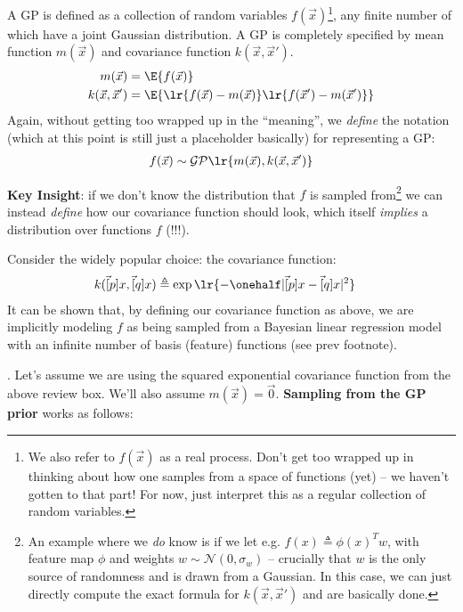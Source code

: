 \documentclass[11pt]{article}
\begin{document}
\begin{example}
	A GP is defined as a collection of random variables $f(\vec x)$\footnote{We also refer to $f(\vec x)$ as a real process. Don't get too wrapped up in thinking about how one samples from a space of functions (yet) -- we haven't gotten to that part! For now, just interpret this as a regular collection of random variables.}, any finite number of which have a joint Gaussian distribution. A GP is completely specified by mean function $m(\vec x)$ and covariance function $k(\vec x, \vec{x}')$. 
	\begin{align}
		m(\vec x) 
			&= \E{f(\vec x)} \\
		k(\vec x, \vec x')
			&= \E{ \lr{  f(\vec x) - m(\vec x) }   \lr{ f(\vec x')  - m(\vec x') }  }
	\end{align}
	Again, without getting too wrapped up in the ``meaning'', we \textit{define} the notation (which at this point is still just a placeholder basically) for representing a GP:
	\begin{align}
		f(\vec x) \sim \mathcal{GP}\lr{  m(\vec x), k(\vec x, \vec x') }
	\end{align}

	\textbf{Key Insight}: if we don't know the distribution that $f$ is sampled from\footnote{An example where we \textit{do} know is if we let e.g. $f(x) \triangleq \phi(x)^T w$, with feature map $\phi$ and weights $w \sim \mathcal{N}(0, \sigma_w)$ -- crucially that $w$ is the only source of randomness and is drawn from a Gaussian. In this case, we can just directly compute the exact formula for $k(\vec x, \vec x')$ and are basically done.} we can instead \textit{define} how our covariance function should look, which itself \textit{implies} a distribution over functions $f$ (!!!). 
	
	Consider the widely popular choice: the  covariance function:
	\begin{align}
		k(\vec[p]{x}, \vec[q]{x})
			&\triangleq \exp\lr{ - \onehalf | \vec[p]{x} - \vec[q]{x} |^2 }
	\end{align}
	It can be shown that, by defining our covariance function as above, we are implicitly modeling $f$ as being sampled from a Bayesian linear regression model with an infinite number of basis (feature) functions (see prev footnote). 
\end{example}

. Let's assume we are using the squared exponential covariance function from the above review box. We'll also assume $m(\vec x) = \vec 0$. \textbf{Sampling from the GP prior} works as follows:
\end{document}
